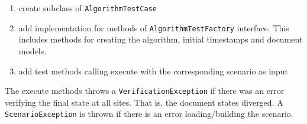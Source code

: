 \documentclass[11pt,a4paper]{article}
\begin{document}
\begin{enumerate}
 \item create subclass of \texttt{AlgorithmTestCase}
 \item add implementation for methods of \texttt{AlgorithmTestFactory} interface.
       This includes methods for creating the algorithm, initial timestamps
       and document models.
 \item add test methods calling execute with the corresponding scenario
       as input
\end{enumerate} 

The execute methods throws a \texttt{VerificationException} if there was an error verifying the final state at all sites. That is, the document states diverged. A \texttt{ScenarioException} is thrown if there is an error loading/building the scenario.
\end{document}
